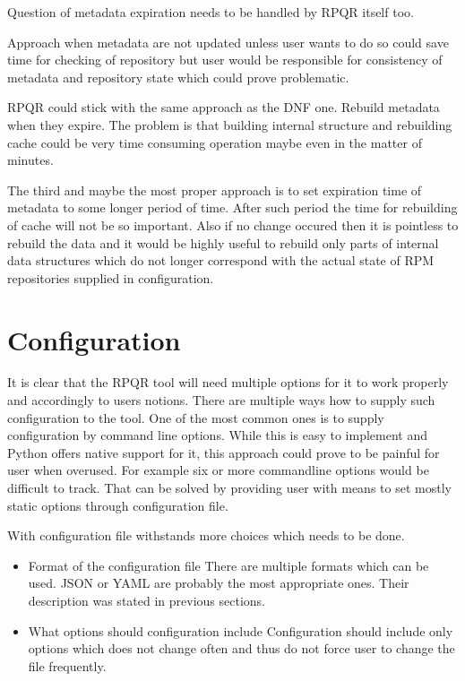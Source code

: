 Question of metadata expiration needs to be handled by RPQR itself too.

Approach when metadata are not updated unless user wants to do so could save time for
checking of repository but user would be responsible for consistency of metadata and repository
state which could prove problematic.

RPQR could stick with the same approach as the DNF one. Rebuild metadata when they expire.
The problem is that building internal structure and rebuilding cache could be very time consuming
operation maybe even in the matter of minutes.

The third and maybe the most proper approach is to set expiration time of metadata to some
longer period of time. After such period the time for rebuilding of cache will not be so important.
Also if no change occured then it is pointless to rebuild the data and it would be highly useful
to rebuild only parts of internal data structures which do not longer correspond with the actual state
of RPM repositories supplied in configuration.

\section{Configuration}
It is clear that the RPQR tool will need multiple options for it to work properly and accordingly to
users notions. There are multiple ways how to supply such configuration to the tool. One of the
most common ones is to supply configuration by command line options. While this is easy to implement
and Python offers native support for it, this approach could prove to be painful for user when
overused. For example six or more commandline options would be difficult to track. That can be solved
by providing user with means to set mostly static options through configuration file.

With configuration file withstands more choices which needs to be done.
\begin{itemize}
  \item Format of the configuration file
        There are multiple formats which can be used. JSON or YAML are probably the most appropriate ones.
        Their description was stated in previous sections.
  \item What options should configuration include
        Configuration should include only options which does not change often and thus do not force
        user to change the file frequently.
\end{itemize}


